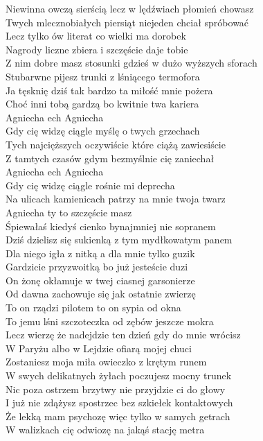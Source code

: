 \begin{text}
    \small{
    Niewinna owczą sierścią lecz w lędźwiach płomień chowasz\\
    Twych mlecznobiałych piersiąt niejeden chciał spróbować\\
    Lecz tylko ów literat co wielki ma dorobek\\
    Nagrody liczne zbiera i szczęście daje tobie\\
    Z nim dobre masz stosunki gdzieś w dużo wyższych sforach\\
    Stubarwne pijesz trunki z lśniącego termofora\\
    Ja tęsknię dziś tak bardzo ta miłość mnie pożera\\
    Choć inni tobą gardzą bo kwitnie twa kariera\\
    Agniecha ech Agniecha\\
    Gdy cię widzę ciągle myślę o twych grzechach\\
    Tych najcięższych oczywiście które ciążą zawiesiście\\
    Z tamtych czasów gdym bezmyślnie cię zaniechał\\
    Agniecha ech Agniecha\\
    Gdy cię widzę ciągle rośnie mi deprecha\\
    Na ulicach kamienicach patrzy na mnie twoja twarz\\
    Agniecha ty to szczęście masz\\
    Śpiewałaś kiedyś cienko bynajmniej nie sopranem\\
    Dziś dzielisz się sukienką z tym mydłkowatym panem\\
    Dla niego igła z nitką a dla mnie tylko guzik\\
    Gardzicie przyzwoitką bo już jesteście duzi\\
    On żonę okłamuje w twej ciasnej garsonierze\\
    Od dawna zachowuje się jak ostatnie zwierzę\\
    To on rządzi pilotem to on sypia od okna\\
    To jemu lśni szczoteczka od zębów jeszcze mokra\\
    Lecz wierzę że nadejdzie ten dzień gdy do mnie wrócisz\\
    W Paryżu albo w Lejdzie ofiarą mojej chuci\\
    Zostaniesz moja miła owieczko z krętym runem\\
    W swych delikatnych żyłach poczujesz mocny trunek\\
    Nic poza ostrzem brzytwy nie przyjdzie ci do głowy\\
    I już nie zdążysz spostrzec bez szkiełek kontaktowych\\
    Że lekką mam psychozę więc tylko w samych getrach\\
    W walizkach cię odwiozę na jakąś stację metra
    }
\end{text}
\begin{chord}

\end{chord}